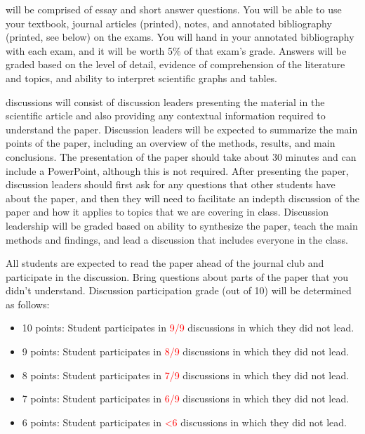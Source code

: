 \documentclass{tufte-handout}
\begin{document}
\begin{fullwidth}




 will be comprised of essay and short answer questions. You will be able to use your textbook, journal articles (printed), notes, and annotated bibliography (printed, see below) on the exams. You will hand in your annotated bibliography with each exam, and it will be worth 5\% of that exam's grade. Answers will be graded based on the level of detail, evidence of comprehension of the literature and topics, and ability to interpret scientific graphs and tables. 

 discussions will consist of discussion leaders presenting the material in the scientific article and also providing any contextual information required to understand the paper. Discussion leaders will be expected to summarize the main points of the paper, including an overview of the methods, results, and main conclusions. The presentation of the paper should take about 30 minutes and can include a PowerPoint, although this is not required. After presenting the paper, discussion leaders should first ask for any questions that other students have about the paper, and then they will need to facilitate an indepth discussion of the paper and how it applies to topics that we are covering in class. Discussion leadership will be graded based on ability to synthesize the paper, teach the main methods and findings, and lead a discussion that includes everyone in the class. 

All students are expected to read the paper ahead of the journal club and participate in the discussion. Bring questions about parts of the paper that you didn't understand. Discussion participation grade (out of 10) will be determined as follows:

\begin{itemize}
\item 10 points: Student participates in \textcolor{red}{9/9} discussions in which they did not lead. 
\item 9 points: Student participates in  \textcolor{red}{8/9} discussions in which they did not lead. 
\item 8 points: Student participates in  \textcolor{red}{7/9} discussions in which they did not lead.
\item 7 points: Student participates in  \textcolor{red}{6/9} discussions in which they did not lead.
\item 6 points: Student participates in  \textcolor{red}{<6} discussions in which they did not lead.
\end{itemize}


\end{fullwidth}
\end{document}

